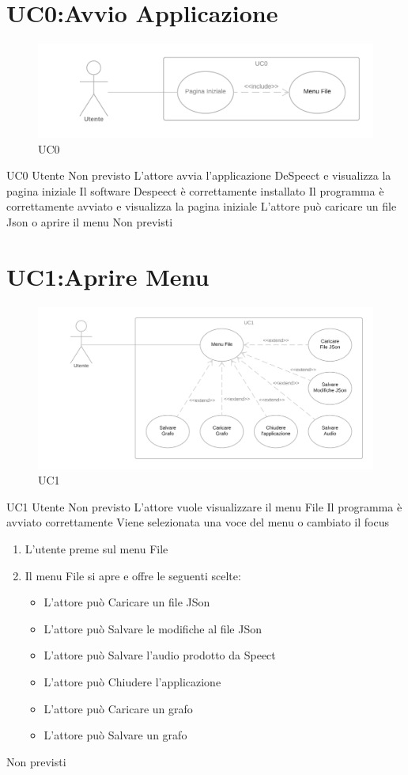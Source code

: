 \documentclass[../AnalisideiRequisiti.tex]{subfiles}
\begin{document}
	\section{UC0:Avvio Applicazione}
	\begin{figure}[H]
		\caption{UC0}
		\centering
		\includegraphics[width=\textwidth]{../img/UC00.png}
	\end{figure}
	\UserCase
	{UC0}
	{Utente}
	{Non previsto}
	{L'attore avvia l'applicazione DeSpeect e visualizza la pagina iniziale}
	{Il software Despeect è correttamente installato}
	{Il programma è correttamente avviato e visualizza la pagina iniziale}
	{L'attore può caricare un file Json o aprire il menu }
	{Non previsti}
	\section{UC1:Aprire Menu}
	\begin{figure}[H]
	\caption{UC1}
	\centering
	\includegraphics[width=\textwidth]{../img/UC01.png}
	\end{figure}
	\UserCase
	{UC1}
	{Utente}
	{Non previsto}
	{L'attore vuole visualizzare il menu File}
	{Il programma è avviato correttamente }
	{Viene selezionata una voce del menu o cambiato il focus}
	{	\begin{enumerate}
			\item{} L'utente preme sul menu File
			\item{} Il menu File si apre e offre le seguenti scelte:
		\begin{itemize}
		\item{} L'attore può Caricare un file JSon 
		\item{} L'attore può Salvare le modifiche al file JSon 
		\item{} L'attore può Salvare l'audio prodotto da Speect 
		\item{} L'attore può Chiudere l'applicazione 
		\item{} L'attore può Caricare un grafo 
		\item{} L'attore può Salvare un grafo 
		\end{itemize}
	\end{enumerate}
	}
	{Non previsti}
\end{document}
